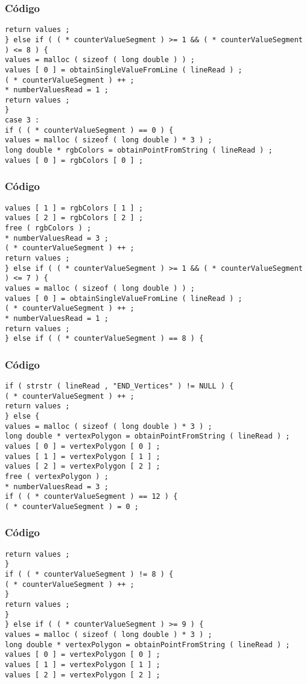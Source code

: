 \documentclass{beamer}
\begin{document}
\begin{frame}[fragile]
\frametitle{C\'odigo}
\begin{verbatim}
return values ; 
} else if ( ( * counterValueSegment ) >= 1 && ( * counterValueSegment ) <= 8 ) { 
values = malloc ( sizeof ( long double ) ) ; 
values [ 0 ] = obtainSingleValueFromLine ( lineRead ) ; 
( * counterValueSegment ) ++ ; 
* numberValuesRead = 1 ; 
return values ; 
} 
case 3 : 
if ( ( * counterValueSegment ) == 0 ) { 
values = malloc ( sizeof ( long double ) * 3 ) ; 
long double * rgbColors = obtainPointFromString ( lineRead ) ; 
values [ 0 ] = rgbColors [ 0 ] ; 
\end{verbatim}
\end{frame}
\begin{frame}[fragile]
\frametitle{C\'odigo}
\begin{verbatim}
values [ 1 ] = rgbColors [ 1 ] ; 
values [ 2 ] = rgbColors [ 2 ] ; 
free ( rgbColors ) ; 
* numberValuesRead = 3 ; 
( * counterValueSegment ) ++ ; 
return values ; 
} else if ( ( * counterValueSegment ) >= 1 && ( * counterValueSegment ) <= 7 ) { 
values = malloc ( sizeof ( long double ) ) ; 
values [ 0 ] = obtainSingleValueFromLine ( lineRead ) ; 
( * counterValueSegment ) ++ ; 
* numberValuesRead = 1 ; 
return values ; 
} else if ( ( * counterValueSegment ) == 8 ) { 
\end{verbatim}
\end{frame}
\begin{frame}[fragile]
\frametitle{C\'odigo}
\begin{verbatim}
if ( strstr ( lineRead , "END_Vertices" ) != NULL ) { 
( * counterValueSegment ) ++ ; 
return values ; 
} else { 
values = malloc ( sizeof ( long double ) * 3 ) ; 
long double * vertexPolygon = obtainPointFromString ( lineRead ) ; 
values [ 0 ] = vertexPolygon [ 0 ] ; 
values [ 1 ] = vertexPolygon [ 1 ] ; 
values [ 2 ] = vertexPolygon [ 2 ] ; 
free ( vertexPolygon ) ; 
* numberValuesRead = 3 ; 
if ( ( * counterValueSegment ) == 12 ) { 
( * counterValueSegment ) = 0 ; 
\end{verbatim}
\end{frame}
\begin{frame}[fragile]
\frametitle{C\'odigo}
\begin{verbatim}
return values ; 
} 
if ( ( * counterValueSegment ) != 8 ) { 
( * counterValueSegment ) ++ ; 
} 
return values ; 
} 
} else if ( ( * counterValueSegment ) >= 9 ) { 
values = malloc ( sizeof ( long double ) * 3 ) ; 
long double * vertexPolygon = obtainPointFromString ( lineRead ) ; 
values [ 0 ] = vertexPolygon [ 0 ] ; 
values [ 1 ] = vertexPolygon [ 1 ] ; 
values [ 2 ] = vertexPolygon [ 2 ] ; 
\end{verbatim}
\end{frame}
\end{document}

